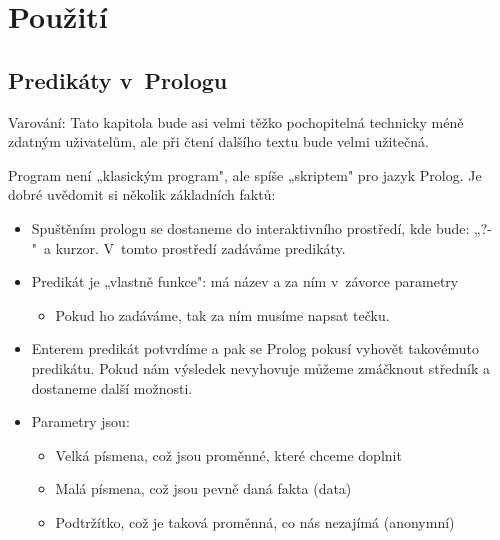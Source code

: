 \documentclass[a4paper]{article}
\begin{document}
\section{Použití}
\subsection{Predikáty v~Prologu}
Varování: Tato kapitola bude asi velmi těžko pochopitelná technicky méně zdatným uživatelům, ale při čtení dalšího textu bude velmi užitečná.

Program není „klasickým program", ale spíše „skriptem" pro jazyk Prolog. Je dobré uvědomit si několik základních faktů:
\begin{itemize}
\item Spuštěním prologu se dostaneme do interaktivního prostředí, kde bude: „?- "~a kurzor. V~tomto prostředí zadáváme predikáty.
\item Predikát je „vlastně funkce": má název a za ním v~závorce parametry
\begin{itemize}
\item Pokud ho zadáváme, tak za ním musíme napsat tečku.
\end{itemize}
\item Enterem predikát potvrdíme a pak se Prolog pokusí vyhovět takovémuto predikátu. Pokud nám výsledek nevyhovuje můžeme zmáčknout středník a dostaneme další možnosti.
\item Parametry jsou:
\begin{itemize}
\item Velká písmena, což jsou proměnné, které chceme doplnit 
\item Malá písmena, což jsou pevně daná fakta (data)
\item Podtržítko, což je taková proměnná, co nás nezajímá (anonymní)
\end{itemize}
\end{itemize}
\end{document}
